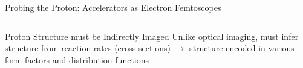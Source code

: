 \documentclass[aspectratio=169]{beamer}
\newcommand*{\myfont}{\fontfamily{lmtt}\selectfont}
\begin{document}
\begin{frame}{Probing the Proton: Accelerators as Electron Femtoscopes}
\begin{columns}
         
    \end{columns}
\end{frame}

\begin{frame}{Proton Structure must be Indirectly Imaged}
Unlike optical imaging, must infer structure from reaction rates (cross sections) $\rightarrow$ structure encoded in various form factors and distribution functions
\end{frame}
\end{document}
